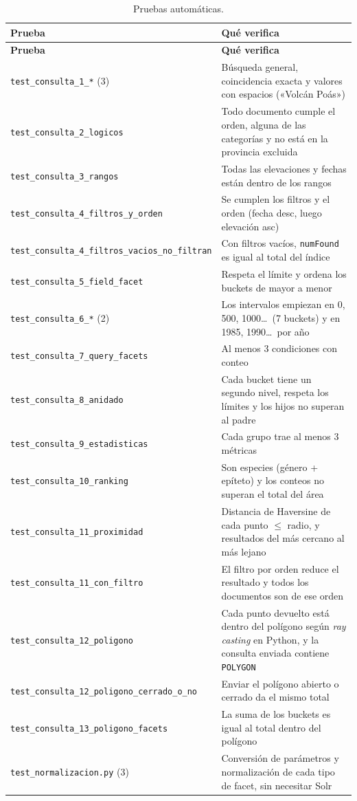 \documentclass[11pt,a4paper]{article}
\newcommand{\cod}[1]{\texttt{#1}}
\begin{document}
{\small
\begin{longtable}{@{}p{5.6cm}p{9.6cm}@{}}
\caption{Pruebas automáticas.}\\
\toprule
\textbf{Prueba} & \textbf{Qué verifica} \\
\midrule
\endfirsthead
\toprule
\textbf{Prueba} & \textbf{Qué verifica} \\
\midrule
\endhead
\bottomrule
\endfoot
\cod{test_consulta_1_*} (3) & Búsqueda general, coincidencia exacta y valores con espacios («Volcán Poás») \\
\cod{test_consulta_2_logicos} & Todo documento cumple el orden, alguna de las categorías y no está en la provincia excluida \\
\cod{test_consulta_3_rangos} & Todas las elevaciones y fechas están dentro de los rangos \\
\cod{test_consulta_4_filtros_y_orden} & Se cumplen los filtros y el orden (fecha desc, luego elevación asc) \\
\cod{test_consulta_4_filtros_vacios_no_filtran} & Con filtros vacíos, \cod{numFound} es igual al total del índice \\
\cod{test_consulta_5_field_facet} & Respeta el límite y ordena los buckets de mayor a menor \\
\cod{test_consulta_6_*} (2) & Los intervalos empiezan en 0, 500, 1000\ldots\ (7 buckets) y en 1985, 1990\ldots\ por año \\
\cod{test_consulta_7_query_facets} & Al menos 3 condiciones con conteo \\
\cod{test_consulta_8_anidado} & Cada bucket tiene un segundo nivel, respeta los límites y los hijos no superan al padre \\
\cod{test_consulta_9_estadisticas} & Cada grupo trae al menos 3 métricas \\
\cod{test_consulta_10_ranking} & Son especies (género + epíteto) y los conteos no superan el total del área \\
\cod{test_consulta_11_proximidad} & Distancia de Haversine de cada punto $\le$ radio, y resultados del más cercano al más lejano \\
\cod{test_consulta_11_con_filtro} & El filtro por orden reduce el resultado y todos los documentos son de ese orden \\
\cod{test_consulta_12_poligono} & Cada punto devuelto está dentro del polígono según \emph{ray casting} en Python, y la consulta enviada contiene \cod{POLYGON} \\
\cod{test_consulta_12_poligono_cerrado_o_no} & Enviar el polígono abierto o cerrado da el mismo total \\
\cod{test_consulta_13_poligono_facets} & La suma de los buckets es igual al total dentro del polígono \\
\cod{test_normalizacion.py} (3) & Conversión de parámetros y normalización de cada tipo de facet, sin necesitar Solr \\
\end{longtable}
}
\end{document}
